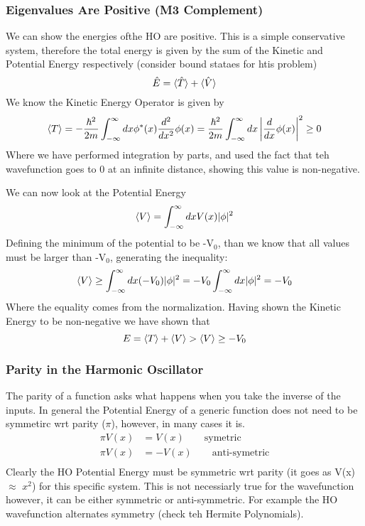 \documentclass{article}
\newcommand{\be}{\begin{equation}}
\newcommand{\ee}{\end{equation}}
\begin{document}
\subsubsection*{Eigenvalues Are Positive (M3 Complement)}
We can show the energies ofthe HO are positive.
This is a simple conservative system, therefore the total energy is given by the sum of the Kinetic and Potential Energy respectively (consider bound stataes for htis problem)
\be
\hat{E} = \braket{\hat{T}} + \braket{\hat{V}}
\ee
We know the Kinetic Energy Operator is given by
\be
\braket{T} = -\frac{\hbar^2}{2m}\int_{-\infty}^\infty dx \phi^*(x) \frac{d^2}{dx^2} \phi(x) = \frac{\hbar^2}{2m} \int_{-\infty}^\infty dx \left|\frac{d}{dx}\phi(x)\right|^2 \geq 0
\ee
Where we have performed integration by parts, and used the fact that teh wavefunction goes to 0 at an infinite distance, showing this value is non-negative.

We can now look at the Potential Energy
\be
\braket{V} = \int_{-\infty}^\infty dx V(x) |\phi|^2
\ee
Defining the minimum of the potential to be -V$_0$, than we know that all values must be larger than -V$_0$, generating the inequality:
\be
\braket{V} \geq \int_{-\infty}^\infty dx (-V_0) |\phi|^2 = -V_0 \int_{-\infty}^\infty dx |\phi|^2 = -V_0
\ee
Where the equality comes from the normalization. 
Having shown the Kinetic Energy to be non-negative we have shown that
\be
E = \braket{T} + \braket{V} > \braket{V} \geq -V_0
\ee

\subsubsection*{Parity in the Harmonic Oscillator}
The parity of a function asks what happens when you take the inverse of the inputs.
In general the Potential Energy of a generic function does not need to be symmetirc wrt parity ($\pi$), however, in many cases it is. 
\be
\begin{split}
    \pi V(x) &= V(x) \quad \quad \text{symetric}\\
    \pi V(x) &= -V(x) \quad \quad \text{anti-symetric}\\
\end{split}
\ee
Clearly the HO Potential Energy  must be symmetric wrt parity (it goes as V(x) $\approx$ $x^2$) for this specific system. 
This is not necessiarly true for the wavefunction however, it can be either symmetric or anti-symmetric.
For example the HO wavefunction alternates symmetry (check teh Hermite Polynomials). 
\end{document}
